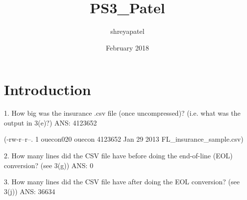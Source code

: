 \documentclass{article}
\title{PS3_Patel}
\author{shreyapatel }
\date{February 2018}
\begin{document}
\maketitle

\section{Introduction}

1. How big was the insurance .csv file (once uncompressed)? (i.e. what was the
output in 3(e)?)
    ANS: 4123652

    (-rw-r--r--. 1 ouecon020 ouecon 4123652 Jan 29  2013 FL_insurance_sample.csv)

2. How many lines did the CSV file have before doing the end-of-line (EOL) conversion? (see 3(g))
    ANS: 0

3. How many lines did the CSV file have after doing the EOL conversion? (see 3(j))
    ANS: 36634
\end{document}
